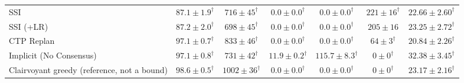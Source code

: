 \begin{table}[t]
{\begin{tabular}{lcccccc}
SSI \cite{koenig2006ssi} & $87.1 \pm 1.9^\dagger$ & $716 \pm 45^\dagger$ & $0.0 \pm 0.0^\dagger$ & $0.0 \pm 0.0^\dagger$ & $221 \pm 16^\dagger$ & $22.66 \pm 2.60^\dagger$ \\
SSI (+LR) & $87.2 \pm 2.0^\dagger$ & $698 \pm 45^\dagger$ & $0.0 \pm 0.0^\dagger$ & $0.0 \pm 0.0^\dagger$ & $205 \pm 16$ & $23.25 \pm 2.72^\dagger$ \\
CTP Replan & $97.1 \pm 0.7^\dagger$ & $833 \pm 46^\dagger$ & $0.0 \pm 0.0^\dagger$ & $0.0 \pm 0.0^\dagger$ & $64 \pm 3^\dagger$ & $20.84 \pm 2.26^\dagger$ \\
Implicit (No Consensus) \cite{alighanbari2005implicit} & $97.1 \pm 0.8^\dagger$ & $731 \pm 42^\dagger$ & $11.9 \pm 0.2^\dagger$ & $115.7 \pm 8.3^\dagger$ & $0 \pm 0^\dagger$ & $32.38 \pm 3.45^\dagger$ \\
Clairvoyant greedy (reference, not a bound) & $98.6 \pm 0.5^\dagger$ & $1002 \pm 36^\dagger$ & $0.0 \pm 0.0^\dagger$ & $0.0 \pm 0.0^\dagger$ & $0 \pm 0^\dagger$ & $23.17 \pm 2.16^\dagger$ \\
\bottomrule
\end{tabular}%
}
\end{table}
